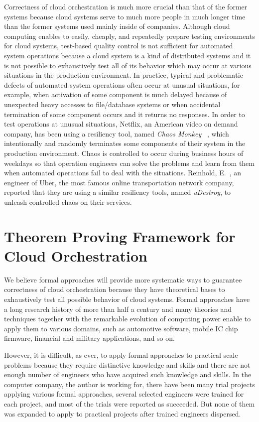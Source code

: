 \documentclass[12pt]{report}
\begin{document}
Correctness of cloud orchestration is much more crucial than that of
the former systems because cloud systems serve to much more people in
much longer time than the former systems used mainly inside of
companies. Although cloud computing enables to easily, cheaply, and
repeatedly prepare testing environments for cloud systems, test-based
quality control is not sufficient for automated system operations
because a cloud system is a kind of distributed systems and it is not
possible to exhaustively test all of its behavior which may occur at
various situations in the production environment. In practice, typical
and problematic defects of automated system operations often occur at
unusual situations, for example, when activation of some component is
much delayed because of unexpected heavy accesses to file/database
systems or when accidental termination of some component occurs and it
returns no responses. In order to test operations at unusual
situations, Netflix, an American video on demand company, has been
using a resiliency tool, named {\it Chaos Monkey} ~\cite{ChaosMonkey},
which intentionally and randomly terminates some components of their
system in the production environment. Chaos is controlled to occur
during business hours of weekdays so that operation engineers can
solve the problems and learn from them when automated operations fail
to deal with the situations. Reinhold, E.~\cite{Reinhold16}, an
engineer of Uber, the most famous online transportation network
company, reported that they are using a similar resiliency tools,
named {\it uDestroy}, to unleash controlled chaos on their services.

\section{Theorem Proving Framework for Cloud Orchestration}
We believe formal approaches will provide more systematic ways to
guarantee correctness of cloud orchestration because they have
theoretical bases to exhaustively test all possible behavior of cloud
systems.  Formal approaches have a long research history of more than
half a century and many theories and techniques together with the
remarkable evolution of computing power enable to apply them to
various domains, such as automotive software, mobile IC chip firmware,
financial and military applications, and so on.

However, it is difficult, as ever, to apply formal approaches to
practical scale problems because they require distinctive knowledge
and skills and there are not enough number of engineers who have
acquired such knowledge and skills. In the computer company, the
author is working for, there have been many trial projects applying
various formal approaches, several selected engineers were trained for
each project, and most of the trials were reported as succeeded. But
none of them was expanded to apply to practical projects after trained
engineers dispersed.
\end{document}
